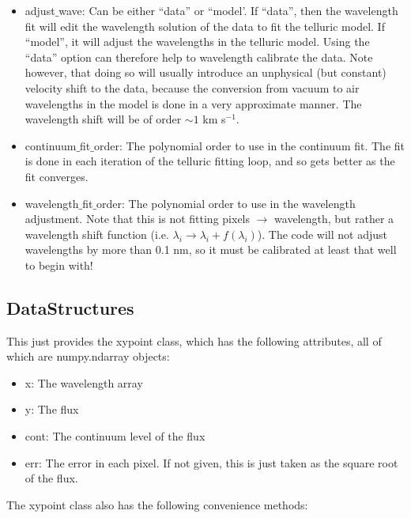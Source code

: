 \documentclass{article}
\begin{document}
\begin{itemize}
\begin{itemize}
      \item adjust$\_$wave: Can be either ``data'' or ``model'. If ``data'', then the wavelength fit will edit the wavelength solution of the data to fit the telluric model. If ``model'', it will adjust the wavelengths in the telluric model. Using the ``data'' option can therefore help to wavelength calibrate the data. Note however, that doing so will usually introduce an unphysical (but constant) velocity shift to the data, because the conversion from vacuum to air wavelengths in the model is done in a very approximate manner. The wavelength shift will be of order $\sim 1$ km s$^{-1}$.
      
      \item continuum$\_$fit$\_$order: The polynomial order to use in the continuum fit. The fit is done in each iteration of the telluric fitting loop, and so gets better as the fit converges.
      
      \item wavelength$\_$fit$\_$order: The polynomial order to use in the wavelength adjustment. Note that this is not fitting pixels $\rightarrow$ wavelength, but rather a wavelength shift function (i.e. $\lambda_i \rightarrow \lambda_i + f(\lambda_i)$). The code will not adjust wavelengths by more than 0.1 nm, so it must be calibrated at least that well to begin with!
    
    \end{itemize}
    
  
  
    
    
    
    
\subsection{DataStructures}
\label{subsec:datastructures}
This just provides the xypoint class, which has the following attributes, all of which are numpy.ndarray objects:
\begin{itemize}
  \item x: The wavelength array
  \item y: The flux
  \item cont: The continuum level of the flux
  \item err: The error in each pixel. If not given, this is just taken as the square root of the flux.
\end{itemize}

The xypoint class also has the following convenience methods:
\begin{itemize}


\end{itemize}
\end{itemize}
\end{document}
